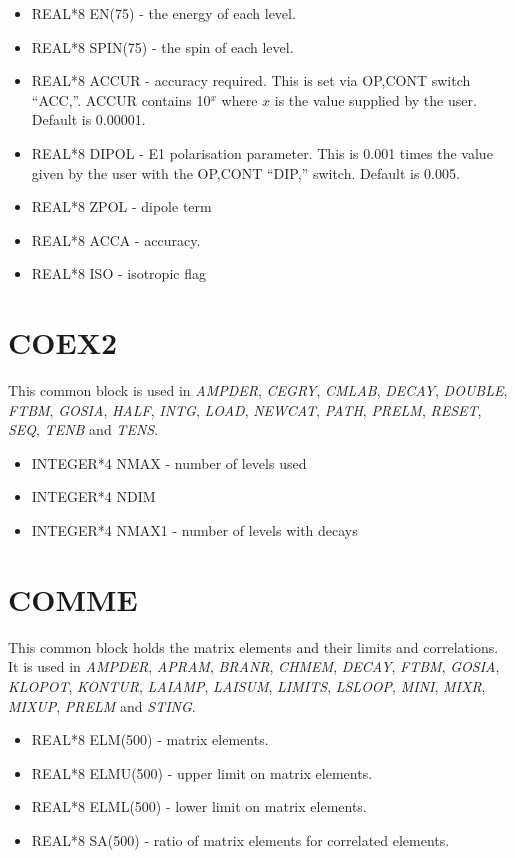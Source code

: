 \begin{itemize}
\item REAL*8 EN(75) - the energy of each level.
\item REAL*8 SPIN(75) - the spin of each level.
\item REAL*8 ACCUR - accuracy required. This is set via OP,CONT switch
``ACC,''. ACCUR contains 10$^x$ where $x$ is the value supplied by the user.
Default is 0.00001.
\item REAL*8 DIPOL - E1 polarisation parameter. This is 0.001 times the
value given by the user with the OP,CONT ``DIP,'' switch. Default is 0.005.
\item REAL*8 ZPOL - dipole term
\item REAL*8 ACCA - accuracy.
\item REAL*8 ISO - isotropic flag
\end{itemize}

\section{COEX2}

This common block is used in {\em AMPDER}, {\em CEGRY}, {\em CMLAB}, {\em
DECAY}, {\em DOUBLE}, {\em FTBM}, {\em GOSIA}, {\em HALF}, {\em INTG}, {\em
LOAD}, {\em NEWCAT}, {\em PATH}, {\em PRELM}, {\em RESET}, {\em SEQ}, {\em
TENB} and {\em TENS}.

\begin{itemize}
\item INTEGER*4 NMAX - number of levels used
\item INTEGER*4 NDIM
\item INTEGER*4 NMAX1 - number of levels with decays
\end{itemize}

\section{COMME}

This common block holds the matrix elements and their limits and
correlations. It is used in {\em AMPDER}, {\em APRAM}, {\em BRANR}, {\em
CHMEM}, {\em DECAY}, {\em FTBM}, {\em GOSIA}, {\em KLOPOT}, {\em KONTUR},
{\em LAIAMP}, {\em LAISUM}, {\em LIMITS}, {\em LSLOOP}, {\em MINI}, {\em
MIXR}, {\em MIXUP}, {\em PRELM} and {\em STING}.

\begin{itemize}
\item REAL*8 ELM(500) - matrix elements.
\item REAL*8 ELMU(500) - upper limit on matrix elements.
\item REAL*8 ELML(500) - lower limit on matrix elements.
\item REAL*8 SA(500) - ratio of matrix elements for correlated elements.
\end{itemize}

